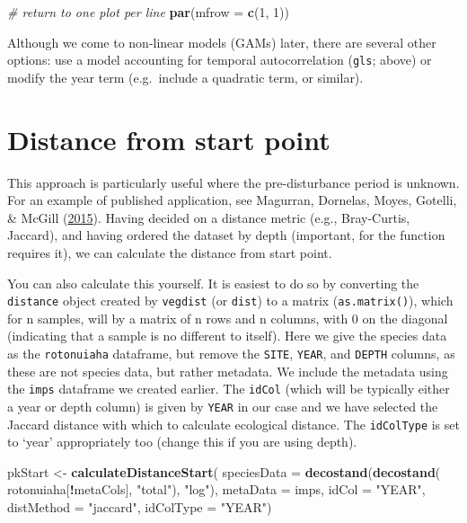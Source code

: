 \documentclass[nofonts,]{tufte-handout}
\newenvironment{Shaded}{\begin{snugshade}}{\end{snugshade}}
\newcommand{\AttributeTok}[1]{\textcolor[rgb]{0.13,0.29,0.53}{#1}}
\newcommand{\CommentTok}[1]{\textcolor[rgb]{0.56,0.35,0.01}{\textit{#1}}}
\newcommand{\DecValTok}[1]{\textcolor[rgb]{0.00,0.00,0.81}{#1}}
\newcommand{\FunctionTok}[1]{\textcolor[rgb]{0.13,0.29,0.53}{\textbf{#1}}}
\newcommand{\NormalTok}[1]{#1}
\newcommand{\OtherTok}[1]{\textcolor[rgb]{0.56,0.35,0.01}{#1}}
\newcommand{\SpecialCharTok}[1]{\textcolor[rgb]{0.81,0.36,0.00}{\textbf{#1}}}
\newcommand{\StringTok}[1]{\textcolor[rgb]{0.31,0.60,0.02}{#1}}
\begin{document}
\begin{Shaded}
\begin{Highlighting}[]
\CommentTok{\# return to one plot per line}
\FunctionTok{par}\NormalTok{(}\AttributeTok{mfrow =} \FunctionTok{c}\NormalTok{(}\DecValTok{1}\NormalTok{, }\DecValTok{1}\NormalTok{))}
\end{Highlighting}
\end{Shaded}

Although we come to non-linear models (GAMs) later, there are several
other options: use a model accounting for temporal autocorrelation
(\texttt{gls}; above) or modify the year term (e.g.~include a quadratic
term, or similar).

\hypertarget{distance-from-start-point}{%
\section{Distance from start point}\label{distance-from-start-point}}

This approach is particularly useful where the pre-disturbance period is
unknown. For an example of published application, see Magurran,
Dornelas, Moyes, Gotelli, \& McGill
(\protect\hyperlink{ref-magurran_15_rapid}{2015}). Having decided on a
distance metric (e.g., Bray-Curtis, Jaccard), and having ordered the
dataset by depth (important, for the function requires it), we can
calculate the distance from start point.

You can also calculate this yourself. It is easiest to do so by
converting the \texttt{distance} object created by \texttt{vegdist} (or
\texttt{dist}) to a matrix (\texttt{as.matrix()}), which for n samples,
will by a matrix of n rows and n columns, with 0 on the diagonal
(indicating that a sample is no different to itself). Here we give the
species data as the \texttt{rotonuiaha} dataframe, but remove the
\texttt{SITE}, \texttt{YEAR}, and \texttt{DEPTH} columns, as these are
not species data, but rather metadata. We include the metadata using the
\texttt{imps} dataframe we created earlier. The \texttt{idCol} (which
will be typically either a year or depth column) is given by
\texttt{YEAR} in our case and we have selected the Jaccard distance with
which to calculate ecological distance. The \texttt{idColType} is set to
`year' appropriately too (change this if you are using depth).

\begin{Shaded}
\begin{Highlighting}[]
\NormalTok{pkStart }\OtherTok{\textless{}{-}} \FunctionTok{calculateDistanceStart}\NormalTok{(}
  \AttributeTok{speciesData =} \FunctionTok{decostand}\NormalTok{(}\FunctionTok{decostand}\NormalTok{(}
\NormalTok{    rotonuiaha[}\SpecialCharTok{!}\NormalTok{metaCols], }
    \StringTok{"total"}\NormalTok{), }\StringTok{"log"}\NormalTok{), }
  \AttributeTok{metaData =}\NormalTok{ imps,}
  \AttributeTok{idCol =} \StringTok{"YEAR"}\NormalTok{,}
  \AttributeTok{distMethod =} \StringTok{"jaccard"}\NormalTok{,}
  \AttributeTok{idColType =} \StringTok{"YEAR"}\NormalTok{)}
\end{Highlighting}
\end{Shaded}
\end{document}
